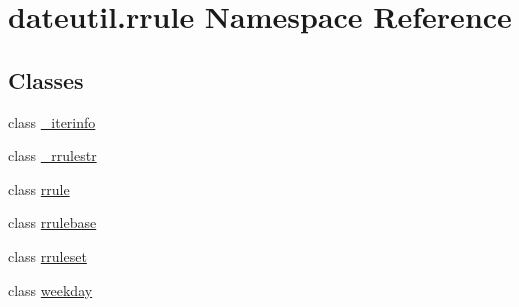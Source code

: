 \hypertarget{namespacedateutil_1_1rrule}{}\section{dateutil.\+rrule Namespace Reference}
\label{namespacedateutil_1_1rrule}
\subsection*{Classes}
\begin{DoxyCompactItemize}
\item 
class \hyperlink{classdateutil_1_1rrule_1_1__iterinfo}{\+\_\+iterinfo}
\item 
class \hyperlink{classdateutil_1_1rrule_1_1__rrulestr}{\+\_\+rrulestr}
\item 
class \hyperlink{classdateutil_1_1rrule_1_1rrule}{rrule}
\item 
class \hyperlink{classdateutil_1_1rrule_1_1rrulebase}{rrulebase}
\item 
class \hyperlink{classdateutil_1_1rrule_1_1rruleset}{rruleset}
\item 
class \hyperlink{classdateutil_1_1rrule_1_1weekday}{weekday}
\end{DoxyCompactItemize}
